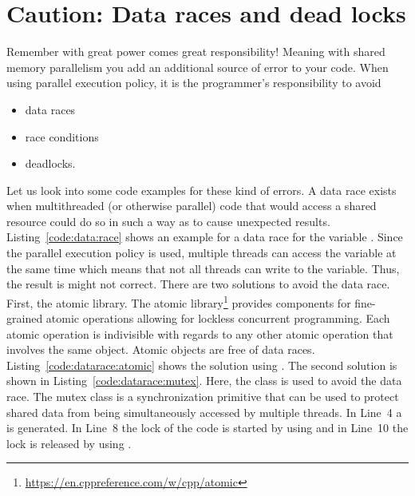 \section{Caution: Data races and dead locks}
\label{sec:deadlocks}
Remember with great power comes great responsibility! Meaning with shared memory parallelism you add an additional source of error to your code. When using parallel execution policy, it is the programmer's responsibility to avoid
\begin{itemize}
\item data races
\item race conditions
\item deadlocks.
\end{itemize} 
Let us look into some code examples for these kind of errors. A data race exists when multithreaded (or otherwise parallel) code that would access a shared resource could do so in such a way as to cause unexpected results. Listing~\ref{code:data:race} shows an example for a data race for the variable . Since the parallel execution policy is used, multiple threads can access the variable  at the same time which means that not all threads can write to the variable. Thus, the result is might not correct. There are two solutions to avoid the data race. First, the atomic library. The atomic library\footnote{\tiny\url{https://en.cppreference.com/w/cpp/atomic}} provides components for fine-grained atomic operations allowing for lockless concurrent programming. Each atomic operation is indivisible with regards to any other atomic operation that involves the same object. Atomic objects are free of data races. Listing~\ref{code:datarace:atomic} shows the solution using . The second solution is shown in Listing~\ref{code:datarace:mutex}. Here, the  class is used to avoid the data race. The mutex class is a synchronization primitive that can be used to protect shared data from being simultaneously accessed by multiple threads. In Line~4 a  is generated. In Line~8 the lock of the code is started by using  and in Line~10 the lock is released by using .

